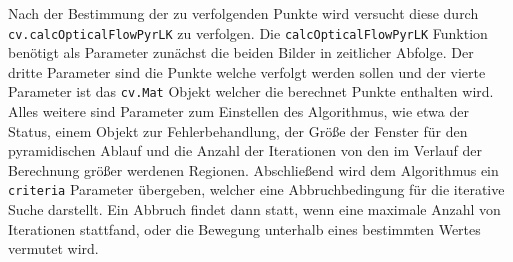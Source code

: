 Nach der Bestimmung der zu verfolgenden Punkte wird versucht diese durch \lstinline{cv.calcOpticalFlowPyrLK} zu verfolgen.
Die \lstinline{calcOpticalFlowPyrLK} Funktion benötigt als Parameter zunächst die beiden Bilder in zeitlicher Abfolge.
Der dritte Parameter sind die Punkte welche verfolgt werden sollen und der vierte Parameter ist das \lstinline{cv.Mat} Objekt welcher die berechnet Punkte enthalten wird.
Alles weitere sind Parameter zum Einstellen des Algorithmus, wie etwa der Status, einem Objekt zur Fehlerbehandlung, der Grö{\ss}e der Fenster für den pyramidischen Ablauf und die Anzahl der Iterationen von den im Verlauf der Berechnung grö{\ss}er werdenen Regionen.
Abschlie{\ss}end wird dem Algorithmus ein \lstinline{criteria} Parameter übergeben, welcher eine Abbruchbedingung für die iterative Suche darstellt.
Ein Abbruch findet dann statt, wenn eine maximale Anzahl von Iterationen stattfand, oder die Bewegung unterhalb eines bestimmten Wertes vermutet wird.


